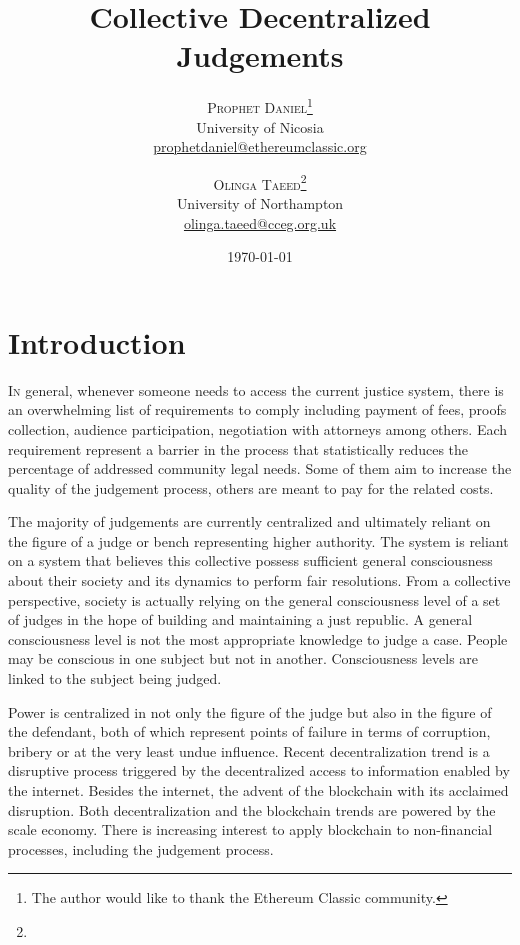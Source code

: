 \documentclass[twoside,twocolumn]{article}
\title{Collective Decentralized Judgements} %
\author{%
\textsc{Prophet Daniel}\thanks{The author would like to thank the Ethereum Classic community.} \\[1ex] %
\normalsize University of Nicosia \\ %
\normalsize \href{mailto:prophetdaniel@ethereumclassic.org}{prophetdaniel@ethereumclassic.org} %
\and %
\textsc{Olinga Taeed}\thanks{} \\[1ex] %
\normalsize University of Northampton \\ %
\normalsize \href{mailto:olinga.taeed@cceg.org.uk}{olinga.taeed@cceg.org.uk} %
}
\date{\today} %
\begin{document}
\maketitle


\section{Introduction}

\lettrine[nindent=0em,lines=3]{I}n general, whenever someone needs to access the
current justice system, there is an overwhelming list of requirements to comply
including payment of fees, proofs collection, audience participation,
negotiation with attorneys among others. Each requirement represent a barrier in
the process that statistically reduces the percentage of addressed community
legal needs. Some of them aim to increase the quality of the judgement process,
others are meant to pay for the related costs.


The majority of judgements are currently centralized and ultimately reliant on
the figure of a judge or bench representing higher authority. The system is
reliant on a system that believes this collective possess sufficient general
consciousness about their society and its dynamics to perform fair resolutions.
From a collective perspective, society is actually relying on the general
consciousness level of a set of judges in the hope of building and maintaining a
just republic. A general consciousness level is not the most appropriate
knowledge to judge a case. People may be conscious  in one subject but not in
another. Consciousness levels are linked to the subject being judged\cite{DanielDAGS2016}.

Power is centralized in not only the figure of the judge but also in the figure
of the defendant, both of which represent points of failure in terms of
corruption, bribery or at the very least undue influence. Recent
decentralization trend is a disruptive process triggered by the decentralized
access to information enabled by the internet. Besides the internet, the advent
of the blockchain with its acclaimed disruption. Both decentralization and the
blockchain trends are powered by the scale economy. There is increasing interest
to apply blockchain to non-financial processes, including the judgement
process\cite{AntonopoulosDAMN2016}.
\end{document}
